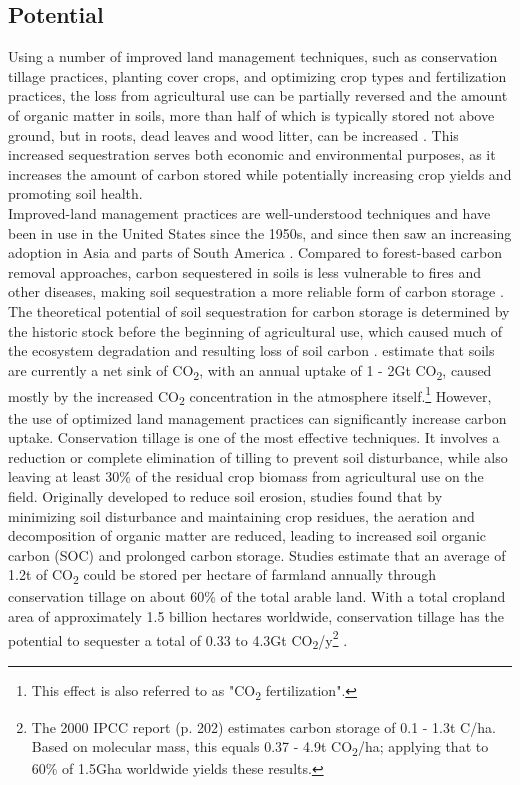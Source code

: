 \subsection*{Potential}
Using a number of improved land management techniques, such as conservation tillage practices, planting cover crops, and optimizing crop types and fertilization practices, the loss from agricultural use can be partially reversed and the amount of organic matter in soils, more than half of which is typically stored not above ground, but in roots, dead leaves and wood litter, can be increased \parencite[192]{Ontl2012SoilStorage,Watson2000LandForestry}. This increased sequestration serves both economic and environmental purposes, as it increases the amount of carbon stored while potentially increasing crop yields and promoting soil health. \parencite{Dipple2021TheSystems}\\
Improved-land management practices are well-understood techniques and have been in use in the United States since the 1950s, and since then saw an increasing adoption in Asia and parts of South America \parencite[202]{Watson2000LandForestry}. Compared to forest-based carbon removal approaches, carbon sequestered in soils is less vulnerable to fires and other diseases, making soil sequestration a more reliable form of carbon storage \parencite{Dipple2021TheSystems}. The theoretical potential of soil sequestration for carbon storage is determined by the historic stock before the beginning of agricultural use, which caused much of the ecosystem degradation and resulting loss of soil carbon \parencite{NationalAcademiesofSciences2018NegativeAgenda}.
\textcite{Dipple2021TheSystems} estimate that soils are currently a net sink of CO\textsubscript{2}, with an annual uptake of 1 - 2Gt CO\textsubscript{2}, caused mostly by the increased CO\textsubscript{2} concentration in the atmosphere itself.\footnote{This effect is also referred to as "CO\textsubscript{2} fertilization".}
However, the use of optimized land management practices can significantly increase carbon uptake. Conservation tillage is one of the most effective techniques. It involves a reduction or complete elimination of tilling to prevent soil disturbance, while also leaving at least 30\% of the residual crop biomass from agricultural use on the field. Originally developed to reduce soil erosion, studies found that by minimizing soil disturbance and maintaining crop residues, the aeration and decomposition of organic matter are reduced, leading to increased soil organic carbon (SOC) and prolonged carbon storage. Studies estimate that an average of 1.2t of CO\textsubscript{2} could be stored per hectare of farmland annually through conservation tillage on about 60\% of the total arable land. With a total cropland area of approximately 1.5 billion hectares worldwide, conservation tillage has the potential to sequester a total of 0.33 to 4.3Gt CO\textsubscript{2}/y\footnote{The 2000 IPCC report (p. 202) estimates carbon storage of 0.1 - 1.3t C/ha. Based on molecular mass, this equals 0.37 - 4.9t CO\textsubscript{2}/ha; applying that to 60\% of 1.5Gha worldwide yields these results.} \parencite{NationalResearchCouncil2015ClimateSequestration, Watson2000LandForestry}.
